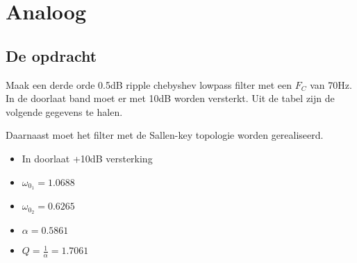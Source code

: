 \section{Analoog}
\subsection{De opdracht}
\begin{minipage}{0.45\textwidth}
	Maak een derde orde 0.5dB ripple chebyshev lowpass filter met een $F_C$ van 70Hz. In de doorlaat band 
	moet er met 10dB worden versterkt. Uit de tabel zijn de volgende gegevens te halen.

	\noindent
	Daarnaast moet het filter met de Sallen-key topologie worden gerealiseerd.
\end{minipage}
\hfill
\begin{minipage}{0.45\textwidth}
	\begin{itemize}
		\item In doorlaat +10dB versterking
		\item $\omega_{0_1}=1.0688$ 
		\item $\omega_{0_2}=0.6265$
		\item $\alpha = 0.5861$
		\item $Q=\frac{1}{\alpha}=1.7061$
	\end{itemize} %
\end{minipage}

